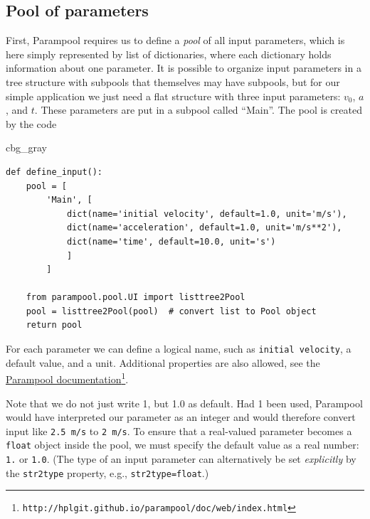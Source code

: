 \documentclass[graybox,envcountchap,sectrefs,final]{svmonodo}
\newenvironment{_cod_tight}[1]{
   \def\FrameCommand{\colorbox{#1}}
   \FrameRule0.6pt\MakeFramed {\FrameRestore}\vskip3mm}
   {\vskip0mm\endMakeFramed}
\newenvironment{cod}[1]{
\bgroup\rmfamily
\fboxsep=0mm\relax
\begin{_cod_tight}{#1}
\list{}{\parsep=-2mm\parskip=0mm\topsep=0pt\leftmargin=2mm
\rightmargin=2\leftmargin\leftmargin=4pt\relax}
\item\relax}
{\endlist\end{_cod_tight}\egroup}
\newenvironment{notice_mdfboxadmon}[1][]{
\begin{notice_mdfboxmdframed}[frametitle=#1]
}
{
\end{notice_mdfboxmdframed}
}
\begin{document}
\subsection{Pool of parameters}

First, Parampool requires us to define a \emph{pool} of all input
parameters, which is here simply represented by list of dictionaries, where each
dictionary holds information about one parameter. It is possible to
organize input parameters in a tree structure with subpools that
themselves may have
subpools,
but for our simple application we just need a flat structure with
three input parameters:
$v_0$, $a$, and $t$. These parameters are put in a subpool called
``Main''. The pool is created by the code

\begin{cod}{cbg_gray}\begin{Verbatim}[numbers=none,fontsize=\fontsize{9pt}{9pt},baselinestretch=0.95,xleftmargin=2mm]
def define_input():
    pool = [
        'Main', [
            dict(name='initial velocity', default=1.0, unit='m/s'),
            dict(name='acceleration', default=1.0, unit='m/s**2'),
            dict(name='time', default=10.0, unit='s')
            ]
        ]

    from parampool.pool.UI import listtree2Pool
    pool = listtree2Pool(pool)  # convert list to Pool object
    return pool
\end{Verbatim}
\end{cod}
\noindent
For each parameter we can define a logical name, such as \texttt{initial velocity},
a default value, and a unit. Additional properties
are also allowed, see the \href{{http://hplgit.github.io/parampool/doc/web/index.html}}{Parampool documentation}\footnote{\texttt{http://hplgit.github.io/parampool/doc/web/index.html}}.


\begin{notice_mdfboxadmon}
Note that we do not just write 1, but 1.0 as default.
Had 1 been used, Parampool would have interpreted our parameter as
an integer and would therefore convert input like \texttt{2.5 m/s} to \texttt{2 m/s}.
To ensure that a real-valued parameter becomes a \texttt{float} object inside
the pool, we must specify the default value as a real number: \texttt{1.} or \texttt{1.0}.
(The type of an input parameter can alternatively be set \emph{explicitly} by
the \texttt{str2type} property, e.g., \texttt{str2type=float}.)
\end{notice_mdfboxadmon}
\end{document}
